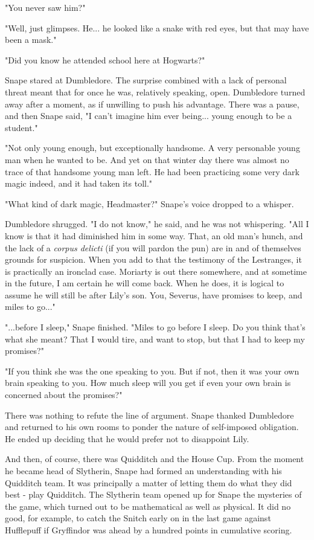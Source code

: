 \documentclass[a4paper,11pt]{article}
\begin{document}
"You never saw him?"

"Well, just glimpses. He... he looked like a snake with red eyes, but that may have been a mask."

"Did you know he attended school here at Hogwarts?"

Snape stared at Dumbledore. The surprise combined with a lack of personal threat meant that for once he was, relatively speaking, open. Dumbledore turned away after a moment, as if unwilling to push his advantage. There was a pause, and then Snape said, "I can't imagine him ever being... young enough to be a student."

"Not only young enough, but exceptionally handsome. A very personable young man when he wanted to be. And yet on that winter day there was almost no trace of that handsome young man left. He had been practicing some very dark magic indeed, and it had taken its toll."

"What kind of dark magic, Headmaster?" Snape's voice dropped to a whisper.

Dumbledore shrugged. "I do not know," he said, and he was not whispering. "All I know is that it had diminished him in some way. That, an old man's hunch, and the lack of a \emph{corpus delicti} (if you will pardon the pun) are in and of themselves grounds for suspicion. When you add to that the testimony of the Lestranges, it is practically an ironclad case. Moriarty is out there somewhere, and at sometime in the future, I am certain he will come back. When he does, it is logical to assume he will still be after Lily's son. You, Severus, have promises to keep, and miles to go..."

"...before I sleep," Snape finished. "Miles to go before I sleep. Do you think that's what she meant? That I would tire, and want to stop, but that I had to keep my promises?"

"If you think she was the one speaking to you. But if not, then it was your own brain speaking to you. How much sleep will you get if even your own brain is concerned about the promises?"

There was nothing to refute the line of argument. Snape thanked Dumbledore and returned to his own rooms to ponder the nature of self-imposed obligation. He ended up deciding that he would prefer not to disappoint Lily.

And then, of course, there was Quidditch and the House Cup. From the moment he became head of Slytherin, Snape had formed an understanding with his Quidditch team. It was principally a matter of letting them do what they did best - play Quidditch. The Slytherin team opened up for Snape the mysteries of the game, which turned out to be mathematical as well as physical. It did no good, for example, to catch the Snitch early on in the last game against Hufflepuff if Gryffindor was ahead by a hundred points in cumulative scoring.
\end{document}
